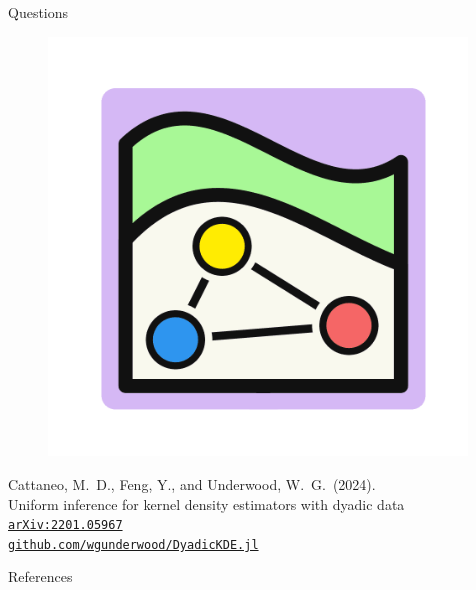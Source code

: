 \documentclass{beamer}
\begin{document}
\begin{frame}{Questions}
  \vspace{2mm}

  \begin{minipage}{0.20\textwidth}
    \begin{figure}[ht]
      \centering
      \hspace*{-3mm}%
      \includegraphics[width=0.99\textwidth]{graphics/logo_dyadic.png}%
      \hspace*{0mm}%
    \end{figure}
  \end{minipage}
  \begin{minipage}{0.79\textwidth}
    \footnotesize{
      Cattaneo, M.\ D.,
      Feng, Y.,
      and Underwood, W.\ G.\ (2024). \\
      Uniform inference for kernel density estimators with dyadic data \\
      \href{https://arxiv.org/abs/2201.05967}%
      {\texttt{arXiv:2201.05967}} \\
      \href{https://github.com/WGUNDERWOOD/DyadicKDE.jl}%
      {\texttt{github.com/wgunderwood/DyadicKDE.jl}}
    }%
  \end{minipage}

\end{frame}

\appendix

\begin{frame}{References}
  
  \renewcommand{\bibsection}{}
  \footnotesize{}
\end{frame}

\endNoHyper
\end{document}
